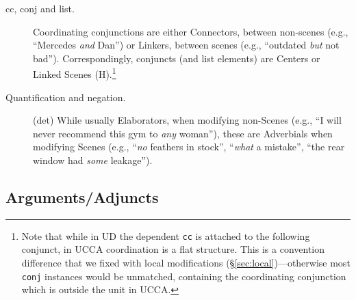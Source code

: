 \documentclass[11pt,a4paper]{article}
\begin{document}
\begin{description}
    \item[cc, conj and list.]
    Coordinating conjunctions are either Connectors, between non-scenes
    (e.g., ``Mercedes \textit{and} Dan'')
    or Linkers, between scenes
    (e.g., ``outdated \textit{but} not bad'').
    Correspondingly, conjuncts (and list elements)
    are Centers or Linked Scenes (H).\footnote{Note
    that while in UD the dependent \texttt{cc} is attached to the following conjunct,
    in UCCA coordination is a flat structure.
    This is a convention difference that we fixed with local modifications
    (\S\ref{sec:local})---otherwise most \texttt{conj} instances would be unmatched,
    containing the coordinating conjunction which is outside the unit in UCCA.}

    \item [Quantification and negation.] (det)
    While usually Elaborators, when modifying non-Scenes
    (e.g., ``I will never recommend this gym to \textit{any} woman''),
    these are Adverbials when modifying Scenes
    (e.g., ``\textit{no} feathers in stock'', ``\textit{what} a mistake'',
    ``the rear window had \textit{some} leakage'').
\end{description}

\subsection{Arguments/Adjuncts}\label{sec:arguments}
\end{document}
